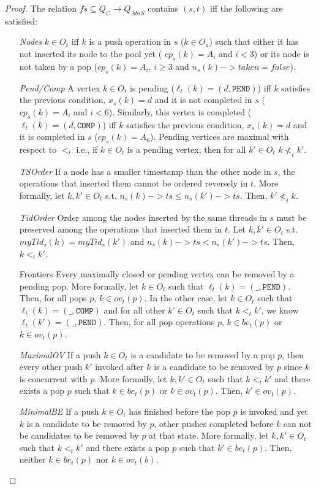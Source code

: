 \documentclass{article}
\begin{document}
\begin{proof}
The relation $fs \subseteq Q_C \rightarrow Q_{AbsS}$ contains $(s,t)$ iff the following are satisfied:
\begin{itemize}
\item[\emph{Nodes}] $k \in O_t$ iff $k$ is a push operation in $s$ ($k \in O_a$) such that either it has not inserted its node to the pool yet ( $cp_s(k) = A_i$ and $i<3$) or its node is not taken by a pop ($cp_s(k) = A_i$, $i\geq 3$ and $n_s(k)->taken = false$). 
\item[\emph{Pend/Comp}] A vertex $k \in O_t$ is pending ($\ell_t(k) = (d, \texttt{PEND})$) iff $k$ satisfies the previous condition, $x_s(k) = d$ and it is not completed in $s$ ($cp_s(k) = A_i$ and $i<6$). Similarly, this vertex is completed ($\ell_t(k) = (d, \texttt{COMP})$) iff $k$ satisfies the previous condition, $x_s(k) = d$ and it is completed in $s$ ($cp_s(k) = A_6$). Pending vertices are maximal with respect to $<_t$ i.e., if $k \in O_t$ is a pending vertex, then for all $k' \in O_t$ $k \nless_t k'$.
\item[\emph{TSOrder}] If a node has a smaller timestamp than the other node in $s$, the operations that inserted them cannot be ordered reversely in $t$. More formally, let $k, k' \in O_t$ s.t. $n_s(k)-> ts \leq n_s(k')->ts$. Then, $k' \nless_t k$.
\item[\emph{TidOrder}] Order among the nodes inserted by the same threads in $s$ must be preserved among the operations that inserted them in $t$. Let $k, k' \in O_t$ s.t. $myTid_s(k) = myTid_s(k')$ and $n_s(k)->ts < n_s(k')->ts$. Then, $k <_t k'$.
\item[Frontiers] Every maximally closed or pending vertex can be removed by a pending pop. More formally, let $k \in O_t$ such that $\ell_t(k) = (\_,\texttt{PEND})$. Then, for all pops $p$, $k \in ov_t(p)$. In the other case, let $k \in O_t$ such that $\ell_t(k) = (\_,\texttt{COMP})$ and for all other $k' \in O_t$ such that $k<_t k'$, we know $\ell_t(k') = (\_,\texttt{PEND})$. Then, for all pop operations $p$, $k \in be_t(p)$ or $k \in ov_t(p)$. 
\item[\emph{MaximalOV}] If a push $k \in O_t$ is a candidate to be removed by a pop $p$, then every other push $k'$ invoked after $k$ is a candidate to be removed by $p$ since $k$ is concurrent with $p$. More formally, let $k, k' \in O_t$ such that $k <_t k'$ and there exists a pop $p$ such that $k \in be_t(p)$ or $k \in ov_t(p)$. Then, $k' \in ov_t(p)$.
\item[\emph{MinimalBE}] If a push $k \in O_t$ has finished before the pop $p$ is invoked and yet $k$ is a candidate to be removed by $p$, other pushes completed before $k$ can not be candidates to be removed by $p$ at that state. More formally, let $k, k' \in O_t$ such that $k <_t k'$ and there exists a pop $p$ such that $k' \in be_t(p)$. Then, neither $k \in be_t(p)$ nor $k \in ov_t(b)$.

\end{itemize}
\end{proof}
\end{document}
